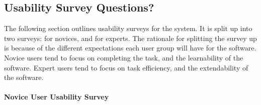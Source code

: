 \documentclass[12pt, titlepage]{article}
\begin{document}
\subsection{Usability Survey Questions?}
The following section outlines usability surveys for the system. It is split up 
into two surveys: for novices, and for experts. The rationale for splitting the 
survey up is because of the different expectations each user group will have 
for the software. Novice users tend to focus on completing the task, and the 
learnability of the software. Expert users tend to focus on task efficiency, 
and the extendability of the software.

\paragraph{Novice User Usability Survey}\label{survey:novice}
~\newline
\end{document}
